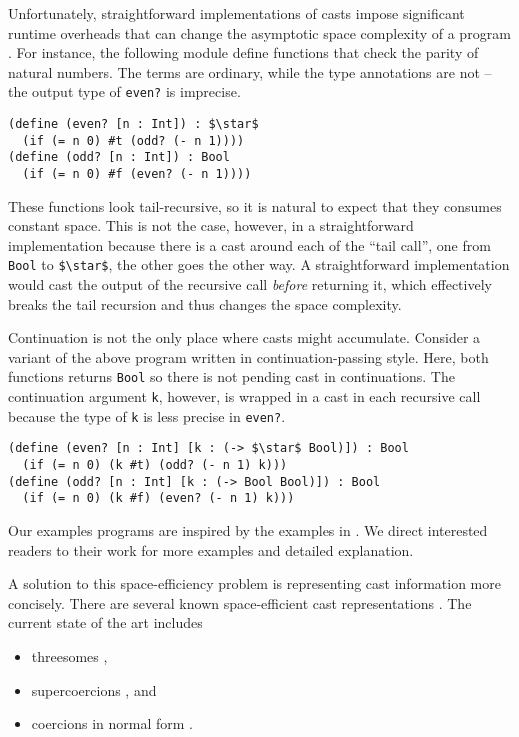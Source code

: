 \documentclass[runningheads]{llncs}
\begin{document}
Unfortunately, straightforward implementations of casts impose significant 
runtime overheads that can change the asymptotic space complexity of a program 
\citep{herman2010space}.
For instance, the following module define functions 
that check the parity of natural numbers. The terms are ordinary, while the 
type annotations are not -- the output type of \lstinline|even?| is 
imprecise.
\begin{lstlisting}
(define (even? [n : Int]) : $\star$
  (if (= n 0) #t (odd? (- n 1))))
(define (odd? [n : Int]) : Bool
  (if (= n 0) #f (even? (- n 1))))
\end{lstlisting}
These functions look tail-recursive, so it is natural to expect that they 
consumes constant space. This is not the case, however, in a straightforward 
implementation because there is a cast around each of the 
``tail call'', one from \lstinline|Bool| to 
\lstinline|$\star$|, the other goes the other way.
A straightforward implementation would cast the output of the recursive 
call \textit{before} returning it, which effectively breaks the tail recursion 
and thus changes the space complexity.

Continuation is not the only place where casts might accumulate. 
Consider a variant of the above program written in continuation-passing style. 
Here, both functions returns \lstinline|Bool| so there is not pending cast in 
continuations. The continuation argument \lstinline|k|, however, is wrapped in 
a cast in each recursive call because the type of \lstinline|k| is less 
precise in \lstinline|even?|.
\begin{lstlisting}
(define (even? [n : Int] [k : (-> $\star$ Bool)]) : Bool
  (if (= n 0) (k #t) (odd? (- n 1) k)))
(define (odd? [n : Int] [k : (-> Bool Bool)]) : Bool
  (if (= n 0) (k #f) (even? (- n 1) k)))
\end{lstlisting}
Our examples programs are inspired by the examples in \citep{herman2010space}.
We direct interested readers to their work for more examples and detailed explanation.

A solution to this space-efficiency problem is representing cast information 
more concisely. There are several known space-efficient cast representations
\citep{Siek:2015:BCT:2737924.2737968,Siek:2010:TWB:1706299.1706342,Garcia:2013:CTB:2500365.2500603,kuhlenschmidt2018efficient,siek2012interpretations,garcia2014deriving}.
The current state of the art includes
\begin{itemize}
	\item threesomes 
	\citep{Siek:2010:TWB:1706299.1706342,Garcia:2013:CTB:2500365.2500603},
	\item supercoercions \citep{Garcia:2013:CTB:2500365.2500603}, and
	\item coercions in normal form
	\citep{siek2012interpretations,Siek:2015:BCT:2737924.2737968}.
\end{itemize}
\end{document}
